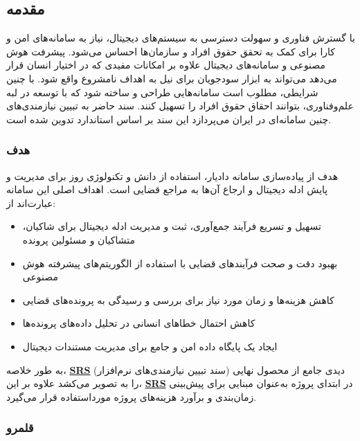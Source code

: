 \documentclass[12pt,a4paper,oneside]{article}
\begin{document}
	\subsection{مقدمه}	
		با گسترش فناوری و سهولت دسترسی به سیستم‌های دیجیتال، نیاز به سامانه‌های امن و کارا برای کمک به تحقق
	حقوق افراد و سازمان‌ها احساس می‌شود. پیشرفت هوش مصنوعی و سامانه‌های دیجیتال علاوه بر امکانات مفیدی
	که در اختیار انسان قرار می‌دهد می‌تواند به ابزار سودجویان برای نیل به اهداف نامشروع واقع شود. با چنین شرایطی،
	مطلوب است سامانه‌هایی طراحی و ساخته شود که با توسعه در لبه علم‌وفناوری، بتوانند احقاق حقوق افراد را تسهیل
	 کنند.	سند حاضر به تبیین نیازمندی‌های چنین سامانه‌ای 
		در ایران می‌پردازد این سند بر اساس استاندارد 
		تدوین شده است.
		\subsubsection{هدف}
		هدف از پیاده‌سازی سامانه دادیار، استفاده از دانش و تکنولوژی روز برای مدیریت و پایش ادله دیجیتال و ارجاع آن‌ها به مراجع قضایی است. اهداف اصلی این سامانه عبارت‌اند از:
		
		\begin{itemize}
			\item تسهیل و تسریع فرآیند جمع‌آوری، ثبت و مدیریت ادله دیجیتال برای شاکیان، متشاکیان و مسئولین پرونده
			\item بهبود دقت و صحت فرآیندهای قضایی با استفاده از الگوریتم‌های پیشرفته هوش مصنوعی
			\item کاهش هزینه‌ها و زمان مورد نیاز برای بررسی و رسیدگی به پرونده‌های قضایی
			\item کاهش احتمال خطاهای انسانی در تحلیل داده‌های پرونده‌ها
			\item ایجاد یک پایگاه داده امن و جامع برای مدیریت مستندات دیجیتال
		\end{itemize}

		به طور خلاصه، \hyperref[ref:srs]{\textbf{SRS}} (سند تبیین نیازمندی‌های نرم‌افزار) دیدی جامع از محصول نهایی را به تصویر می‌کشد
		علاوه بر این، \hyperref[ref:srs]{\textbf{SRS}} در ابتدای پروژه به‌عنوان مبنایی برای پیش‌بینی زمان‌بندی و برآورد هزینه‌های پروژه مورداستفاده قرار می‌گیرد.
			
		\subsubsection{قلمرو}
\end{document}
